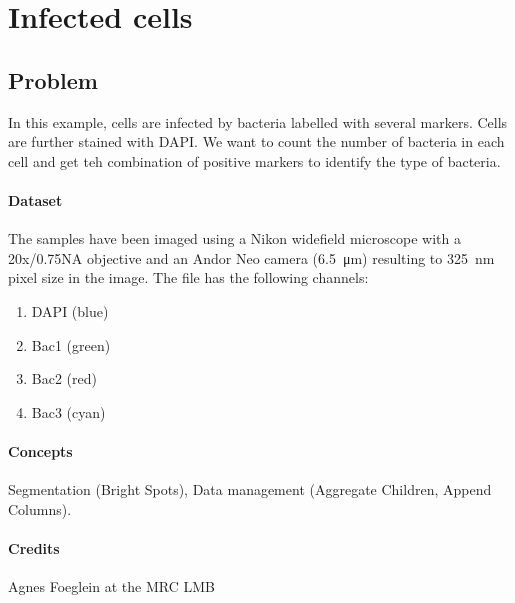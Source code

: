 \section{Infected cells}

\subsection*{Problem}

In this example, cells are infected by bacteria labelled with several markers. Cells are further stained with DAPI. We want to count the number of bacteria in each cell and get teh combination of positive markers to identify the type of bacteria.


\paragraph{Dataset} 
The samples have been imaged using a Nikon widefield microscope with a 20x/0.75NA objective and an Andor Neo camera (\SI{6.5}{\micro\meter}) resulting to \SI{325}{\nano\meter} pixel size in the image. The file  has the following channels:
\begin{enumerate}
    \item DAPI (blue)
    \item Bac1 (green)
    \item Bac2 (red)
    \item Bac3 (cyan)
\end{enumerate}

\paragraph{Concepts} Segmentation (Bright Spots), Data management (Aggregate Children, Append Columns).

\paragraph{Credits} Agnes Foeglein at the MRC LMB

